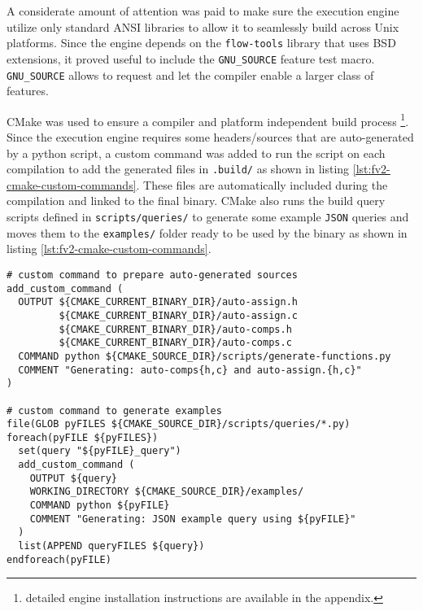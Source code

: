 A considerate amount of attention was paid to make sure the execution engine
utilize only standard ANSI libraries to allow it to seamlessly build
 across Unix platforms. Since the engine
depends on the \texttt{flow-tools} library that uses BSD extensions, it proved
useful to include the \texttt{GNU\_SOURCE} feature test macro.
\texttt{GNU\_SOURCE} allows to request and let the compiler enable a larger
class of features.

CMake was used to ensure a compiler and platform independent build process
\footnote{detailed engine installation instructions are available in the
appendix.}.  Since the execution engine requires some headers/sources that are
auto-generated by a python script, a custom command was added to run the
script on each compilation to add the generated files  in \texttt{.build/} as shown in listing
\ref{lst:fv2-cmake-custom-commands}. These files are automatically included
during the compilation and linked to the final binary.  CMake also
runs the build query scripts defined in \texttt{scripts/queries/} to generate
some example \texttt{JSON} queries and moves them to the \texttt{examples/}
folder ready to be used by the binary as shown in listing
\ref{lst:fv2-cmake-custom-commands}.

\begin{lstlisting}
# custom command to prepare auto-generated sources
add_custom_command (
  OUTPUT ${CMAKE_CURRENT_BINARY_DIR}/auto-assign.h
         ${CMAKE_CURRENT_BINARY_DIR}/auto-assign.c
         ${CMAKE_CURRENT_BINARY_DIR}/auto-comps.h
         ${CMAKE_CURRENT_BINARY_DIR}/auto-comps.c
  COMMAND python ${CMAKE_SOURCE_DIR}/scripts/generate-functions.py
  COMMENT "Generating: auto-comps{h,c} and auto-assign.{h,c}"
)

# custom command to generate examples
file(GLOB pyFILES ${CMAKE_SOURCE_DIR}/scripts/queries/*.py)
foreach(pyFILE ${pyFILES})
  set(query "${pyFILE}_query")
  add_custom_command (
    OUTPUT ${query}
    WORKING_DIRECTORY ${CMAKE_SOURCE_DIR}/examples/
    COMMAND python ${pyFILE}
    COMMENT "Generating: JSON example query using ${pyFILE}"
  )
  list(APPEND queryFILES ${query})
endforeach(pyFILE)
\end{lstlisting}

